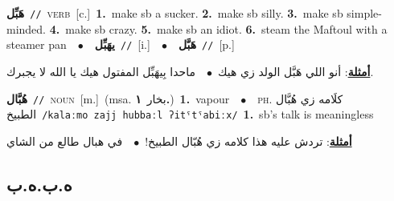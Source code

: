 \documentclass[10pt,a4paper,twoside]{article} %
\begin{document}
\begin{multicols}{2}
{{{{{{{{\setlength\topsep{0pt}\textbf{\foreignlanguage{arabic}{هَبِّل}}\ {\color{gray}\texttt{//}\color{black}}\ \textsc{verb}\ [c.]\ \textbf{1.}~make sb a sucker.  \textbf{2.}~make sb silly.  \textbf{3.}~make sb simple-minded.  \textbf{4.}~make sb crazy.  \textbf{5.}~make sb an idiot.  \textbf{6.}~steam the Maftoul with a steamer pan\ \ $\bullet$\ \ \setlength\topsep{0pt}\textbf{\foreignlanguage{arabic}{يهَبِّل}}\ {\color{gray}\texttt{//}\color{black}}\ [i.]\ \ $\bullet$\ \ \setlength\topsep{0pt}\textbf{\foreignlanguage{arabic}{هَبَّل}}\ {\color{gray}\texttt{//}\color{black}}\ [p.]\  \begin{flushright}\color{gray}\foreignlanguage{arabic}{\textbf{\underline{\foreignlanguage{arabic}{أمثلة}}}: أنو اللي هَبَّل الولد زي هيك\ $\bullet$\ \  ماحدا بِيهَبِّل المفتول هيك يا الله لا يجبرك.}\end{flushright}\color{black}} \vspace{2mm}

{\setlength\topsep{0pt}\textbf{\foreignlanguage{arabic}{هُبَّال}}\ {\color{gray}\texttt{//}\color{black}}\ \textsc{noun}\ [m.]\ \color{gray}(msa. \foreignlanguage{arabic}{بخار}~\foreignlanguage{arabic}{\textbf{١.}})\color{black}\ \textbf{1.}~vapour\ \ $\bullet$\ \ \textsc{ph.} \color{gray} \foreignlanguage{arabic}{كلَامه زي هُبَّال الطبيخ}\color{black}\ {\color{gray}\texttt{/{\sffamily kalaːmo zajj hubbaːl ʔitˤtˤabiːx}/}\color{black}}\ \textbf{1.}~sb's talk is meaningless\  \begin{flushright}\color{gray}\foreignlanguage{arabic}{\textbf{\underline{\foreignlanguage{arabic}{أمثلة}}}: تردش عليه هذا كلامه زي هُبّال الطبيخ!\ $\bullet$\ \  في هبال طالع من الشاي}\end{flushright}\color{black}} \vspace{2mm}

\vspace{-3mm}
\subsection*{\color{blue}\foreignlanguage{arabic}{ه.ب.ه.ب}\color{blue}{}} 

}}}}}}}
\end{multicols}
\end{document}
